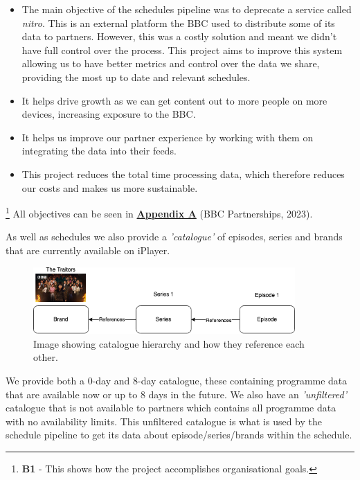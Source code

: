   \begin{itemize}
    \item The main objective of the schedules pipeline was to deprecate a service called \textit{nitro}. This is an external platform the BBC 
    used to distribute some of its data to partners. However, this was a costly solution and meant we didn't have full control over the process. 
    This project aims to improve this system allowing us to have better metrics and control over the data we share, providing the most up to
    date and relevant schedules.
    \item It helps drive growth as we can get content out to more people on more devices, increasing exposure to the BBC.
    \item It helps us improve our partner experience by working with them on integrating the data into their feeds.
    \item This project reduces the total time processing data, which therefore reduces our costs and makes us more sustainable.
  \end{itemize}

  \footnote{\textbf{B1} - This shows how the project accomplishes organisational goals.}
  All objectives can be seen in \hyperref[sec:AppendixA]{\textbf{Appendix A}} (BBC Partnerships, 2023).

  As well as schedules we also provide a \textit{'catalogue'} of episodes, series and brands that are currently available on iPlayer.

  \begin{figure}[H]
    \centering
    \includegraphics[width=10cm]{assets/catalogueHierarchy.drawio.png}
    \caption{Image showing catalogue hierarchy and how they reference each other.}
    \label{fig:catalogueHierarchy}
  \end{figure}
  
  We provide both a 0-day and 8-day catalogue, these containing programme data that are available now or up to 8 days in the future. We 
  also have an \textit{'unfiltered'} catalogue that is not available to partners which contains all programme data with no availability limits.
  This unfiltered catalogue is what is used by the schedule pipeline to get its data about episode/series/brands within the schedule.

